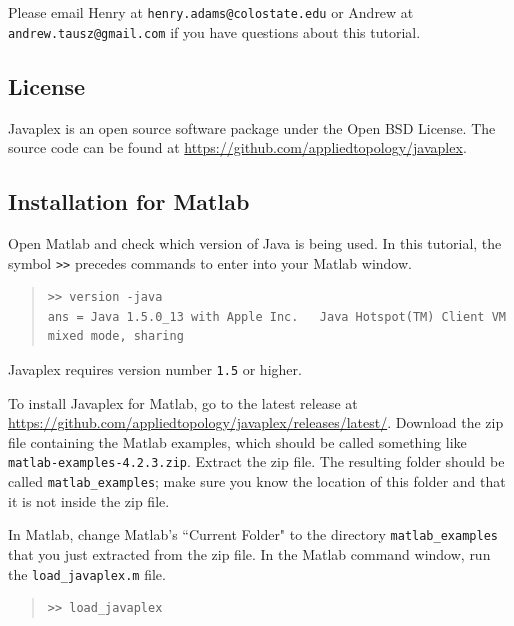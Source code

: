 \documentclass[amscd, amssymb, verbatim]{amsart}[12pt]
\theoremstyle{remark}
\theoremstyle{remark}
\theoremstyle{remark}
\begin{document}

Please email Henry at \texttt{henry.adams@colostate.edu} or Andrew at \texttt{andrew.tausz@gmail.com} if you have questions about this tutorial.


\subsection{License}

Javaplex is an open source software package under the Open BSD License. The source code can be found at \url{https://github.com/appliedtopology/javaplex}.


\subsection{Installation for Matlab}
Open Matlab and check which version of Java is being used. In this tutorial, the symbol \texttt{>>} precedes commands to enter into your Matlab window.

\begin{quote} \begin{verbatim} 
>> version -java
ans = Java 1.5.0_13 with Apple Inc.   Java Hotspot(TM) Client VM mixed mode, sharing
\end{verbatim} \end{quote}

Javaplex requires version number \texttt{1.5} or higher. 

To install Javaplex for Matlab, go to the latest release at \url{https://github.com/appliedtopology/javaplex/releases/latest/}. Download the zip file containing the Matlab examples, which should be called something like \texttt{matlab-examples-4.2.3.zip}. Extract the zip file. The resulting folder should be called \texttt{matlab\_examples}; make sure you know the location of this folder and that it is not inside the zip file.

In Matlab, change Matlab's ``Current Folder" to the directory \texttt{matlab\_examples} that you just extracted from the zip file. In the Matlab command window, run the \texttt{load\_javaplex.m} file. 

\begin{quote} \begin{verbatim} 
>> load_javaplex
\end{verbatim} \end{quote}
\end{document}
